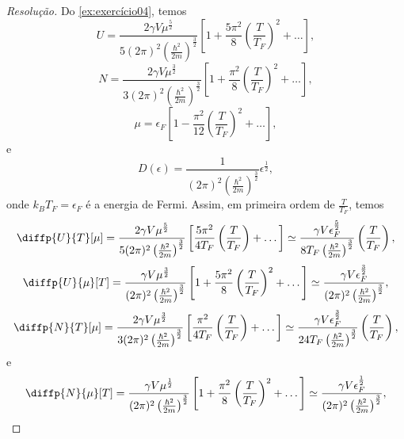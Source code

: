 \begin{proof}[Resolução]
    Do \cref{ex:exercício04}, temos
    \begin{equation*}
        U = \frac{2 \gamma V \mu^{\frac{5}{2}}}{5(2\pi)^2 \left(\frac{\hbar^2}{2m}\right)^{\frac{3}{2}}} \left[1 + \frac{5\pi^2}{8}\left(\frac{T}{T_F}\right)^2 + \dots\right],
    \end{equation*}
    \begin{equation*}
        N = \frac{2\gamma V \mu^{\frac{3}{2}}}{3(2\pi)^2 \left(\frac{\hbar^2}{2m}\right)^{\frac{3}{2}}}\left[1 + \frac{\pi^2}{8}\left(\frac{T}{T_F}\right)^2 + \dots\right],
    \end{equation*}
    \begin{equation*}
        \mu = \epsilon_F \left[1 - \frac{\pi^2}{12}\left(\frac{T}{T_F}\right)^2 + \dots\right],
    \end{equation*}
    e
    \begin{equation*}
        D(\epsilon) = \frac{1}{(2\pi)^2 \left(\frac{\hbar^2}{2m}\right)^{\frac{3}{2}}} \epsilon^{\frac12},
    \end{equation*}
    onde \(k_B T_F = \epsilon_F\) é a energia de Fermi. Assim, em primeira ordem de \(\frac{T}{T_F}\), temos
    \begin{equation*}
        \diffp{U}{T}[\mu] = \frac{2 \gamma V \mu^{\frac{5}{2}}}{5(2\pi)^2 \left(\frac{\hbar^2}{2m}\right)^{\frac{3}{2}}} \left[\frac{5\pi^2}{4T_F}\left(\frac{T}{T_F}\right) + \dots\right] \simeq \frac{\gamma V \epsilon_F^{\frac52}}{8T_F \left(\frac{\hbar^2}{2m}\right)^{\frac32}}\left(\frac{T}{T_F}\right),
    \end{equation*}
    \begin{equation*}
        \diffp{U}{\mu}[T] = \frac{\gamma V \mu^{\frac{3}{2}}}{(2\pi)^2 \left(\frac{\hbar^2}{2m}\right)^{\frac{3}{2}}} \left[1 + \frac{5\pi^2}{8}\left(\frac{T}{T_F}\right)^2 + \dots\right] \simeq \frac{\gamma V \epsilon_F^{\frac32}}{(2\pi)^2\left(\frac{\hbar^2}{2m}\right)^{\frac32}},
    \end{equation*}
    \begin{equation*}
        \diffp{N}{T}[\mu] = \frac{2\gamma V \mu^{\frac{3}{2}}}{3(2\pi)^2 \left(\frac{\hbar^2}{2m}\right)^{\frac{3}{2}}}\left[\frac{\pi^2}{4T_F}\left(\frac{T}{T_F}\right) + \dots\right] \simeq \frac{\gamma V \epsilon_F^{\frac{3}{2}}}{24 T_F \left(\frac{\hbar^2}{2m}\right)^{\frac{3}{2}}}\left(\frac{T}{T_F}\right),
    \end{equation*}
    e
    \begin{equation*}
        \diffp{N}{\mu}[T] = \frac{\gamma V \mu^{\frac{1}{2}}}{(2\pi)^2 \left(\frac{\hbar^2}{2m}\right)^{\frac{3}{2}}}\left[1 + \frac{\pi^2}{8}\left(\frac{T}{T_F}\right)^2 + \dots\right] \simeq \frac{\gamma V \epsilon_F^{\frac{1}{2}}}{(2\pi)^2 \left(\frac{\hbar^2}{2m}\right)^{\frac{3}{2}}},

\end{equation*}
\end{proof}

